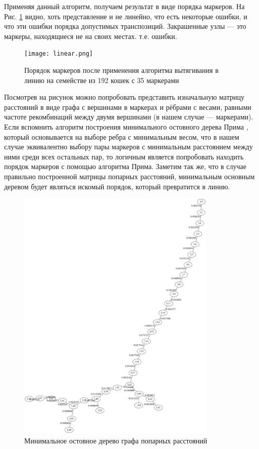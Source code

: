 \documentclass{matmex-diploma-custom}
\begin{document}
Применяя данный алгоритм, получаем результат в виде порядка маркеров.
На Рис. \ref{fig:fig3} видно, хоть представление и не линейно, что
есть некоторые ошибки, и что эти ошибки порядка допустимых
транспозиций. Закрашенные узлы --- это маркеры, находящиеся не на
своих местах. т.е. ошибки.
\begin{figure}[h]
 \centering
  \texttt{[image: linear.png]}
  \caption[width=0.4\textwidth]{Порядок маркеров после применения
    алгоритма вытягивания в линию на семействе из 192 кошек с 35 маркерами}
  \label{fig:fig3}
\end{figure}
Посмотрев на рисунок можно попробовать представить изначальную матрицу
расстояний в виде графа с вершинами в маркерах и рёбрами с весами,
равными частоте рекомбинаций между двумя вершинами (в нашем случае ---
маркерами). Если вспомнить алгоритм построения минимального остовного
дерева Прима \cite{cormen2001introduction}, который основывается на
выборе ребра с минимальным весом, что в нашем случае эквивалентно
выбору пары маркеров с минимальным расстоянием между ними среди всех
остальных пар, то логичным является попробовать находить порядок
маркеров с помощью алгоритма Прима. Заметим так же, что в случае
правильно построенной матрицы попарных расстояний, минимальным
основным деревом будет являться искомый порядок, который превратится в
линию.
\begin{figure}[h]
  \centering
  \includegraphics[width=0.85\textwidth]{prm.png}
  \caption[width=0.4\textwidth]{Минимальное остовное дерево графа
    попарных расстояний}
  \label{fig:fig4}
\end{figure}
\end{document}
